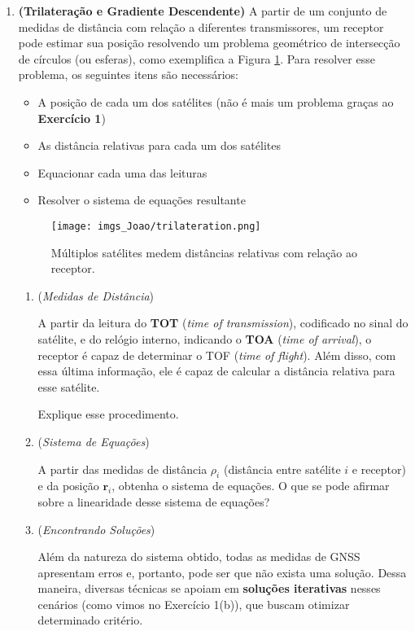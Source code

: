 \documentclass[9pt]{article}
\begin{document}
\begin{enumerate}[label=$\blacktriangleright$ {\bf Exercício \arabic*},series=exerc,align=left]
\item {\bf (Trilateração e Gradiente Descendente)} A partir de um conjunto de medidas de distância com relação a diferentes transmissores, um receptor pode estimar sua posição resolvendo um problema geométrico de intersecção de círculos (ou esferas), como exemplifica a Figura \ref{fig:trilateration}. Para resolver esse problema, os seguintes itens são necessários:
\begin{itemize}
    \item A posição de cada um dos satélites (não é mais um problema graças ao \textbf{Exercício 1})
    \item As distância relativas para cada um dos satélites
    \item Equacionar cada uma das leituras
    \item Resolver o sistema de equações resultante
\end{itemize}

\begin{figure}[H]
    \centering
    \texttt{[image: imgs\_Joao/trilateration.png]}
    \caption{Múltiplos satélites medem distâncias relativas com relação ao receptor.}
    \label{fig:trilateration}
\end{figure}

\begin{enumerate}[label=(\alph*)]
    \item (\textit{Medidas de Distância}) 
    
    A partir da leitura do \textbf{TOT} (\textit{time of transmission}), codificado no sinal do satélite, e do relógio interno, indicando o \textbf{TOA} (\textit{time of arrival}), o receptor é capaz de determinar o TOF (\textit{time of flight}). Além disso, com essa última informação, ele é capaz de calcular a distância relativa para esse satélite.

    Explique esse procedimento. 
    
    \item (\textit{Sistema de Equações}) 
    
    A partir das medidas de distância $\rho_i$ (distância entre satélite $i$ e receptor) e da posição $\mathbf{r}_i$, obtenha o sistema de equações. O que se pode afirmar sobre a linearidade desse sistema de equações?

    \item (\textit{Encontrando Soluções})
    
    Além da natureza do sistema obtido, todas as medidas de GNSS apresentam erros e, portanto, pode ser que não exista uma solução. Dessa maneira, diversas técnicas se apoiam em \textbf{soluções iterativas} nesses cenários (como vimos no Exercício 1(b)), que buscam otimizar determinado critério.
    

\end{enumerate}
\end{enumerate}
\end{document}
